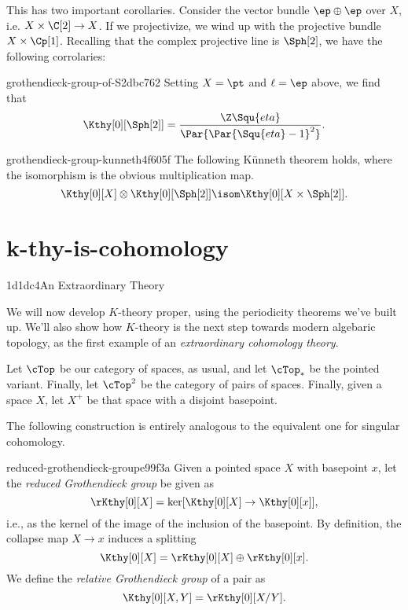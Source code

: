 This has two important corollaries. Consider the vector bundle $\ep \oplus \ep$ over
$X$, i.e. $X \times \C[2] \to X$. If we projectivize, we wind up with the projective
bundle $X \times \Cp[1]$. Recalling that the complex projective line is $\Sph[2]$, we
have the following corrolaries:

\begin{cor}{grothendieck-group-of-S2}{dbc762}
  Setting $X = \pt$ and $\ell = \ep$ above, we find that
  \[ \Kthy[0][{\Sph[2]}] = \frac{{\Z}\Squ{eta}}{\Par{\Par{\Squ{eta} - 1}^2}}. \]
\end{cor}

\begin{cor}{grothendieck-group-kunneth}{4f605f}
  The following K\"unneth theorem holds, where the isomorphism is
  the obvious multiplication map.
  \[ \Kthy[0][X] \otimes \Kthy[0][{\Sph[2]}] \isom
      \Kthy[0][{X \times \Sph[2]}]. \]
\end{cor}
 

\section{k-thy-is-cohomology}{1d1dc4}{An Extraordinary Theory}

We will now develop $K$-theory proper, using the periodicity theorems we've built up.
We'll also show how $K$-theory is the next step towards modern algebaric topology, as
the first example of an \emph{extraordinary cohomology theory}.

Let $\cTop$ be our category of spaces, as usual, and let $\cTop_*$ be the pointed variant.
Finally, let $\cTop^2$ be the category of pairs of spaces. Finally, given a space $X$, let
$X^+$ be that space with a disjoint basepoint.

The following construction is entirely analogous to the equivalent one for singular
cohomology.
\begin{defn}{reduced-grothendieck-group}{e99f3a}
  Given a pointed space $X$ with basepoint $x$, let the \emph{reduced Grothendieck group}
  be given as
  \[ \rKthy[0][X] = \ker[{\Kthy[0][X] \to \Kthy[0][x]}], \]
  i.e., as the kernel of the image of the inclusion of the basepoint. By definition, the
  collapse map $X \to x$ induces a splitting
  \[ \Kthy[0][X] = \rKthy[0][X] \oplus \rKthy[0][x]. \]
  We define the \emph{relative Grothendieck group} of a pair as
  \[ \Kthy[0][X, Y] = \rKthy[0][X/Y]. \]
\end{defn}

